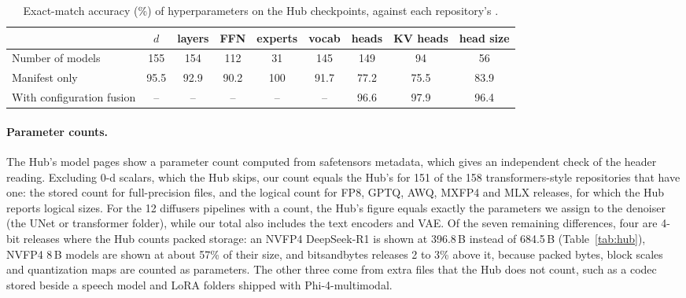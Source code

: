 {\begin{table}[t]
\centering
\small
\begin{tabular}{lcccccccc}
\toprule
& $d$ & layers & FFN & experts & vocab & heads & KV heads & head size \\
\midrule
Number of models & 155 & 154 & 112 & 31 & 145 & 149 & 94 & 56 \\
Manifest only & 95.5 & 92.9 & 90.2 & 100 & 91.7 & 77.2 & 75.5 & 83.9 \\
With configuration fusion & -- & -- & -- & -- & -- & 96.6 & 97.9 & 96.4 \\
\bottomrule
\end{tabular}
\caption{Exact-match accuracy (\%) of hyperparameters on the Hub checkpoints, against each repository's .}
\label{tab:hubhp}
\end{table}

\paragraph{Parameter counts.} The Hub's model pages show a parameter count computed from safetensors metadata, which gives an independent check of the header reading. Excluding 0-d scalars, which the Hub skips, our count equals the Hub's for 151 of the 158 transformers-style repositories that have one: the stored count for full-precision files, and the logical count for FP8, GPTQ, AWQ, MXFP4 and MLX releases, for which the Hub reports logical sizes. For the 12 diffusers pipelines with a count, the Hub's figure equals exactly the parameters we assign to the denoiser (the UNet or transformer folder), while our total also includes the text encoders and VAE. Of the seven remaining differences, four are 4-bit releases where the Hub counts packed storage: an NVFP4 DeepSeek-R1 is shown at 396.8\,B instead of 684.5\,B (Table~\ref{tab:hub}), NVFP4 8\,B models are shown at about 57\% of their size, and bitsandbytes releases 2 to 3\% above it, because packed bytes, block scales and quantization maps are counted as parameters. The other three come from extra files that the Hub does not count, such as a codec stored beside a speech model and LoRA folders shipped with Phi-4-multimodal.

}
